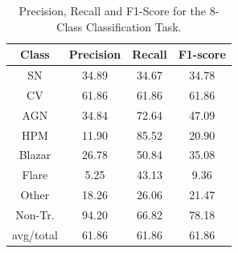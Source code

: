 \documentclass[usenatbib]{mnras}
\begin{document}

\begin{table}
\centering
\begin{tabular}{cccc}
\hline
\textbf{Class} & \textbf{Precision} & \textbf{Recall} & \textbf{F1-score} \\\hline \hline
SN             & 34.89              & 34.67           & 34.78             \\\hline
CV             & 61.86              & 61.86           & 61.86             \\\hline
AGN            & 34.84              & 72.64           & 47.09             \\\hline
HPM            & 11.90              & 85.52           & 20.90             \\\hline
Blazar         & 26.78              & 50.84           & 35.08             \\\hline
Flare          & 5.25               & 43.13           & 9.36              \\\hline
Other          & 18.26              & 26.06           & 21.47             \\\hline
Non-Tr.        & 94.20              & 66.82           & 78.18             \\\hline
avg/total      & 61.86              & 61.86           & 61.86             \\\hline
\end{tabular}%
\caption{Precision, Recall and F1-Score for the 8-Class Classification Task.}
\label{Overall-Scores-8-Class-Regular}
\end{table}
\end{document}
